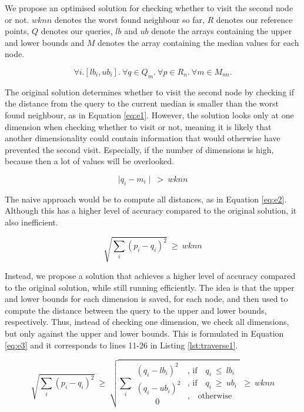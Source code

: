 We propose an optimised solution for checking whether to visit the second node or not. $wknn$ denotes the worst found neighbour so far, $R$ denotes our reference points, $Q$ denotes our queries, $lb$ and $ub$ denote the arrays containing the upper and lower bounds and $M$ denotes the array containing the median values for each node. 

\[
\forall i.[lb_i, ub_i].\ \forall q\in Q_m.\ \forall p\in R_n.\ \forall m\in M_{nn}.
\]

\noindent The original solution determines whether to visit the second node by checking if the distance from the query to the current median is smaller than the worst found neighbour, as in Equation \ref{eq:e1}. However, the solution looks only at one dimension when checking whether to visit or not, meaning it is likely that another dimensionality could contain information that would otherwise have prevented the second visit. Especially, if the number of dimensions is high, because then a lot of values will be overlooked. 

\begin{equation}  \label{eq:e1}
\mid q_i - m_i \mid\ >\ wknn
\end{equation} 

\noindent The naive approach would be to compute all distances, as in Equation \ref{eq:e2}. Although this has a higher level of accuracy compared to the original solution, it also inefficient. 

\begin{equation}  \label{eq:e2}
\sqrt{ \sum_{i}^{} (p_i - q_i)^2  }
\ \geq\ wknn
\end{equation}

\noindent Instead, we propose a solution that achieves a higher level of accuracy compared to the original solution, while still running efficiently. The idea is that the upper and lower bounds for each dimension is saved, for each node, and then used to compute the distance between the query to the upper and lower bounds, respectively. Thus, instead of checking one dimension, we check all dimensions, but only against the upper and lower bounds. This is formulated in Equation \ref{eq:e3} and it corresponds to lines 11-26 in Listing \ref{lst:traverse1}. 

\begin{equation}  \label{eq:e3}
\sqrt{ \sum_{i}^{} (p_i - q_i)^2  }\ \geq\
\sqrt{\sum_{i}^{} \substack{(q_i-lb_i)^2 \\ (q_i-ub_i)^2 \\\text{  ~ ~ ~   }0}  \substack{\text{, if  ~ } q_i\ \leq\ lb_i \\ \text{, if  ~ } q_i\ \geq\ ub_i \\\text{, ~ otherwise} }}
\ \geq\ wknn
\end{equation}

